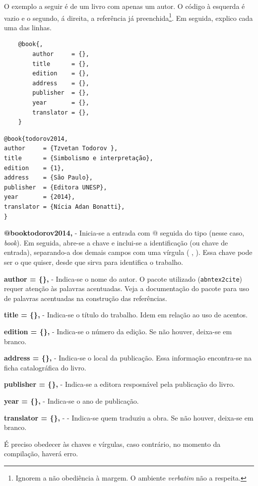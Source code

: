 \documentclass[a4paper,12pt,oneside,openright,extrafontsizes,openbib]{memoir}
\begin{document}
{O exemplo a seguir é de um livro com apenas um autor. O código à esquerda é vazio e o segundo, á direita, a referência já preenchida\footnote{Ignorem a não obediência à margem. O ambiente \textit{verbatim} não a respeita.}. Em seguida, explico cada uma das linhas.

\begin{multicols}{2}
\begin{verbatim}
	@book{, 
		author     = {},
		title      = {},
		edition    = {},
		address    = {},
		publisher  = {},
		year       = {},
		translator = {},
	}
\end{verbatim}

\begin{verbatim}
@book{todorov2014, 
author     = {Tzvetan Todorov },
title      = {Simbolismo e interpretação},
edition    = {1},
address    = {São Paulo},
publisher  = {Editora UNESP},
year       = {2014},
translator = {Nícia Adan Bonatti},
}
\end{verbatim}
\end{multicols}


{\textbf{@book{todorov2014,}} - Inicia-se a entrada com @ seguida do tipo (nesse caso, \textit{book}). Em seguida, abre-se a chave e inclui-se a identificação (ou chave de entrada), separando-a dos demais campos com uma vírgula ( , ). Essa chave pode ser o que quiser, desde que sirva para identifica o trabalho.
	
{\textbf{author     = \{\},}} - Indica-se o nome do autor. O pacote utilizado (\verb|abntex2cite|) requer atenção às palavras acentuadas. Veja a documentação do pacote para uso de palavras acentuadas na construção das referências.

{\textbf{title      = \{\},}} - Indica-se o título do trabalho. Idem em relação ao uso de acentos.

{\textbf{edition    = \{\},}} - Indica-se o número da edição. Se não houver, deixa-se em branco.

{\textbf{address    = \{\},}} - Indica-se o local da publicação. Essa informação encontra-se na ficha catalográfica do livro.

{\textbf{publisher  = \{\},}} - Indica-se a editora resposnável pela publicação do livro.

{\textbf{year       = \{\},}} - Indica-se o ano de publicação.

{\textbf{translator = \{\},}} - - Indica-se quem traduziu a obra. Se não houver, deixa-se em branco.

É preciso obedecer às chaves e vírgulas, caso contrário, no momento da compilação, haverá erro.

}}
\end{document}
